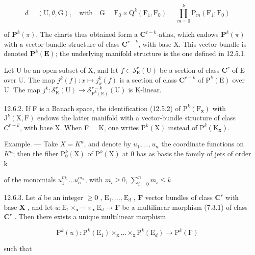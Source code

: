 \[
d = (\mathrm{U}, \theta, \mathrm{G}), \quad \text{with}\quad \mathrm{G} = \mathrm{F}_{0}\times\mathrm{Q}^{k}(\mathrm{F}_{1},\mathrm{F}_{0}) = \prod_{m=0}^{k}\mathrm{P}_{m}(\mathrm{F}_{1};\mathrm{F}_{0})
\]

of \(\mathbf{P}^{k}(\pi)\). The charts thus obtained form a \(\mathbf{C}^{r - k}\)-atlas, which endows \(\mathbf{P}^{k}(\pi)\) with a vector-bundle structure of class \(\mathbf{C}^{r - k}\), with base X. This vector bundle is denoted \(\mathbf{P}^{k}(\mathbf{E})\); the underlying manifold structure is the one defined in 12.5.1.

Let U be an open subset of X, and let \(f \in \mathcal{S}_{\mathrm{E}}^{r}(\mathrm{U})\) be a section of class \(\mathbf{C}^{r}\) of E over U. The map \(j^{k}(f): x \mapsto j_{x}^{k}(f)\) is a section of class \(\mathbf{C}^{r - k}\) of \(\mathrm{P}^{k}(\mathrm{E})\) over U. The map \(j^{k}: \mathcal{S}_{\mathrm{E}}^{r}(\mathrm{U}) \to \mathcal{S}_{\mathrm{P}^{k}(\mathrm{E})}^{r - k}(\mathrm{U})\) is K-linear.

12.6.2. If F is a Banach space, the identification (12.5.2) of \(\mathrm{P}^{k}(\mathrm{F}_{\mathbf{x}})\) with \(\mathrm{J}^{k}(\mathrm{X},\mathrm{F})\) endows the latter manifold with a vector-bundle structure of class \(C^{r-k}\), with base X. When F = K, one writes \(\mathrm{P}^{k}(\mathrm{X})\) instead of \(\mathrm{P}^{k}(\mathrm{K}_{\mathbf{x}})\).

Example. --- Take \(X = K^{n}\), and denote by \(u_{1}, \ldots, u_{n}\) the coordinate functions on \(K^{n}\); then the fiber \(\mathrm{P}_{0}^{k}(\mathrm{X})\) of \(\mathrm{P}^{k}(\mathrm{X})\) at 0 has as basis the family of jets of order k

of the monomials \(u_{1}^{m_1} \ldots u_{n}^{m_n}\), with \(m_i \geqslant 0\), \(\sum_{i=0}^{n} m_i \leqslant k\).

12.6.3. Let \(d\) be an integer \(\geqslant 0\) , \(\mathrm{E}_{1},\ldots,\mathrm{E}_{d}\) , \(\mathbf{F}\) vector bundles of class \(\mathbf{C}^{r}\) with base \(\mathbf{X}\) , and let \(u\colon\mathrm{E}_{1}\times_{\mathbf{x}}\cdots\times_{\mathbf{x}}\mathrm{E}_{d}\to\mathbf{F}\) be a multilinear morphism (7.3.1) of class \(\mathbf{C}^{r}\) . Then there exists a unique multilinear morphism

\[
\mathrm{P} ^ {k} (u) \colon \mathrm{P} ^ {k} (\mathrm{E} _ {1}) \times_ {\mathrm{x}} \dots \times_ {\mathrm{x}} \mathrm{P} ^ {k} (\mathrm{E} _ {d}) \rightarrow \mathrm{P} ^ {k} (\mathrm{F})
\]

such that


